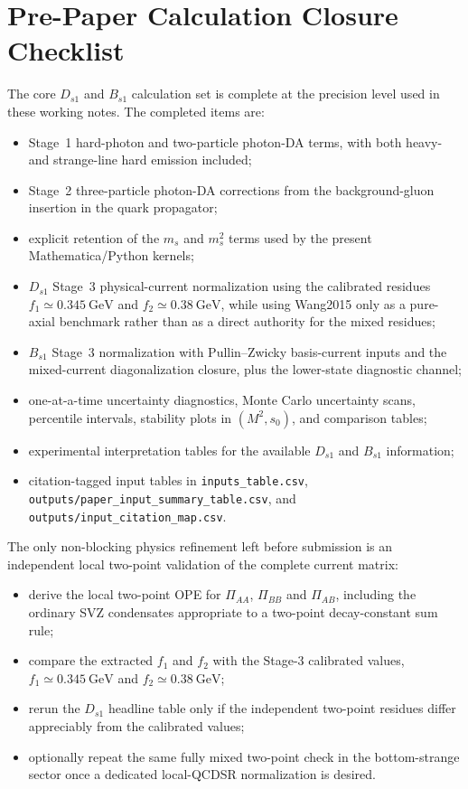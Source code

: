 \documentclass[11pt]{article}
\newcommand{\GeV}{\mathrm{GeV}}
\begin{document}
\section{Pre-Paper Calculation Closure Checklist}

The core $D_{s1}$ and $B_{s1}$ calculation set is complete at the precision
level used in these working notes.  The completed items are:
\begin{itemize}
  \item Stage~1 hard-photon and two-particle photon-DA terms, with both heavy-
  and strange-line hard emission included;
  \item Stage~2 three-particle photon-DA corrections from the background-gluon
  insertion in the quark propagator;
  \item explicit retention of the $m_s$ and $m_s^2$ terms used by the present
  Mathematica/Python kernels;
  \item $D_{s1}$ Stage~3 physical-current normalization using the calibrated
  residues $f_1\simeq0.345~\GeV$ and $f_2\simeq0.38~\GeV$, while using
  Wang2015 only as a pure-axial benchmark rather than as a direct authority for
  the mixed residues;
  \item $B_{s1}$ Stage~3 normalization with Pullin--Zwicky basis-current inputs
  and the mixed-current diagonalization closure, plus the lower-state diagnostic
  channel;
  \item one-at-a-time uncertainty diagnostics, Monte Carlo uncertainty scans,
  percentile intervals, stability plots in $(M^2,s_0)$, and comparison tables;
  \item experimental interpretation tables for the available $D_{s1}$ and
  $B_{s1}$ information;
  \item citation-tagged input tables in \texttt{inputs\_table.csv},
  \texttt{outputs/paper\_input\_summary\_table.csv}, and
  \texttt{outputs/input\_citation\_map.csv}.
\end{itemize}

The only non-blocking physics refinement left before submission is an
independent local two-point validation of the complete current matrix:
\begin{itemize}
  \item derive the local two-point OPE for $\Pi_{AA}$, $\Pi_{BB}$ and
  $\Pi_{AB}$, including the ordinary SVZ condensates appropriate to a
  two-point decay-constant sum rule;
  \item compare the extracted $f_1$ and $f_2$ with the Stage-3 calibrated
  values, $f_1\simeq0.345~\GeV$ and $f_2\simeq0.38~\GeV$;
  \item rerun the $D_{s1}$ headline table only if the independent two-point
  residues differ appreciably from the calibrated values;
  \item optionally repeat the same fully mixed two-point check in the
  bottom-strange sector once a dedicated local-QCDSR normalization is desired.
\end{itemize}
\end{document}
